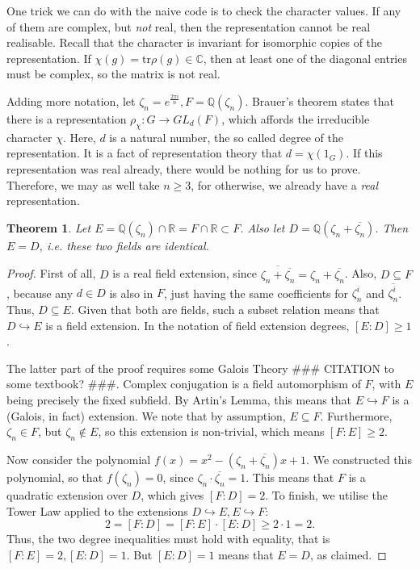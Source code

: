 \documentclass[11pt]{article}
\newtheorem{theorem}{Theorem}[section]
\begin{document}
One trick we can do with the naive code is to check the character values. If any of them are
complex, but \textit{not} real, then the representation cannot be real realisable. Recall that
the character is invariant for isomorphic copies of the representation. If
$\chi(g) = \text{tr}\rho(g) \in \mathbb{C}$, then at least one of the diagonal entries
must be complex, so the matrix is not real.

Adding more notation, let $\zeta_n = e^{\frac{2\pi i}{n}}, F=\mathbb{Q}(\zeta_n)$.
Brauer's theorem \cite[(10.3)]{ISAACS} states that there is a
representation $\rho_\chi: G \rightarrow GL_d(F)$, which affords the irreducible
character $\chi$. Here, $d$ is a natural number, the so called degree of the
representation. It is a fact of representation theory that $d = \chi(1_G)$.
If this representation was real already, there would be nothing for us to prove.
Therefore, we may as well take $n \geq 3$, for otherwise, we already have a
\textit{real} representation.

\begin{theorem}
  Let $E = \mathbb{Q}(\zeta_n) \cap \mathbb{R} = F \cap \mathbb{R} \subset F$.
  Also let $D = \mathbb{Q}(\zeta_n + \overline{\zeta_n})$.
  Then $E = D$, i.e. these two fields are identical.
\end{theorem}
\begin{proof}
  First of all, $D$ is a real field extension, since $\overline{\zeta_n + \overline{\zeta_n}} = \zeta_n + \overline{\zeta_n}$.
  Also, $D \subseteq F$, because any $d \in D$ is also in $F$, just having the same coefficients for $\zeta_n^i$ and $\overline{\zeta_n^i}$.
  Thus, $D \subseteq E$. Given that both are fields, such a subset relation means that $D \hookrightarrow E$ is a field extension.
  In the notation of field extension degrees, $[E:D] \geq 1$.

  The latter part of the proof requires some Galois Theory \#\#\# CITATION to
  some textbook? \#\#\#.
  Complex conjugation is a field automorphism of $F$, with $E$ being precisely
  the fixed subfield.   By Artin's Lemma, this means that $E \hookrightarrow F$
  is a (Galois, in fact) extension. We note that by assumption, $E \subseteq F$.
  Furthermore, $\zeta_n \in F$, but $\zeta_n \notin E$, so this extension is
  non-trivial, which means $[F:E] \geq 2$.

  Now consider the polynomial $f(x) = x^2 - (\zeta_n + \overline{\zeta_n})x + 1$. We constructed this
  polynomial, so that $f(\zeta_n) = 0$, since $\zeta_n \cdot \overline{\zeta_n} = 1$. This means
  that $F$ is a quadratic extension over $D$, which gives $[F:D] = 2$. To finish, we utilise the Tower Law
  applied to the extensions $D \hookrightarrow E, E \hookrightarrow F$:
  \[2 = [F:D] = [F:E] \cdot [E:D] \geq 2 \cdot 1 = 2.\]
  Thus, the two degree inequalities must hold with equality, that is $[F:E] = 2, [E:D] = 1$.
  But $[E:D] = 1$ means that $E = D$, as claimed.
\end{proof}
\end{document}
